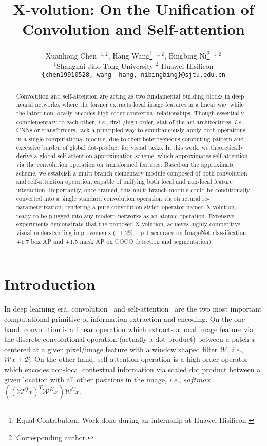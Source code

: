 \documentclass{article}
\title{X-volution: On the Unification of Convolution and Self-attention}
\author{Xuanhong Chen\footnotemark[1]$\;\;^{1,2}$, \enskip Hang Wang\thanks{Equal Contribution. Work done during an internship at Huawei Hisilicon.}$\;\;^{1,2}$, \enskip Bingbing Ni\thanks{Corresponding author.}$\;\;^{1,2}$\\
$^1$Shanghai Jiao Tong University \quad  $^2$ Huawei Hisilicon\\
\texttt{\{chen19910528, wang-\!-hang, nibingbing\}@sjtu.edu.cn}
}
\begin{document}
\maketitle

\begin{abstract}
Convolution and self-attention are acting as two fundamental building blocks in deep neural networks, where the former extracts local image features in a linear way while the latter non-locally encodes high-order contextual relationships.
Though essentially complementary to each other, \emph{i.e.}, first-/high-order, stat-of-the-art architectures, \emph{i.e.}, CNNs or transformers, lack a principled way to simultaneously apply both operations in a single computational module, due to their heterogeneous computing pattern and excessive burden of global dot-product for visual tasks.
In this work, we theoretically derive a global self-attention approximation scheme, which approximates self-attention via the convolution operation on transformed features.
Based on the approximate scheme, we establish a multi-branch elementary module composed of both convolution and self-attention operation, capable of unifying both local and non-local feature interaction.
Importantly, once trained, this multi-branch module could be conditionally converted into a single standard convolution operation via structural re-parameterization, rendering a pure convolution styled operator named X-volution, ready to be plugged into any modern networks as an atomic operation.
Extensive experiments demonstrate that the proposed X-volution, achieves highly competitive visual understanding improvements (+1.2\% top-1 accuracy on ImageNet classification, +1.7 box AP and +1.5 mask AP on COCO detection and segmentation). 
\end{abstract}

\section{Introduction}

In deep learning era, convolution~\cite{726791,DBLP:conf/nips/KrizhevskySH12} and self-attention~\cite{DBLP:conf/nips/VaswaniSPUJGKP17} are the two most important computational primitive of information extraction and encoding.
On the one hand, convolution is a linear operation which extracts a local image feature via the discrete convolutional operation (actually a dot product) between a patch $x$ centered at a given pixel/image feature with a window shaped filter 
{\small{$\mathcal{W}$}}, \emph{i.e.}, {\small{$\mathcal{W}x + \mathcal{B}$}}.
On the other hand, self-attention operation is a high-order operator which encodes non-local contextual information via scaled dot product between a given location with all other positions in the image, \emph{i.e.}, $softmax${\small{$\left(\left(\mathcal{W}^Q x\right)^T\mathcal{W}^K x\right)\mathcal{W}^V x$}}.
\end{document}
